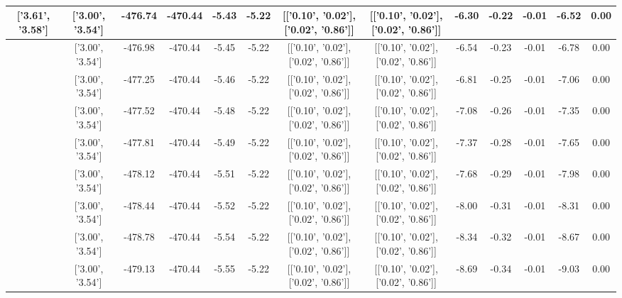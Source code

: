 \begin{table}[htbp]
\begin{adjustbox}{angle=90}
\begin{tabular}{|c|c|c|c|c|c|c|c|c|c|c|c|c|}
 ['3.61', '3.58'] & ['3.00', '3.54'] & -476.74 & -470.44 & -5.43 & -5.22 & [['0.10', '0.02'], ['0.02', '0.86']] & [['0.10', '0.02'], ['0.02', '0.86']] & -6.30 & -0.22 & -0.01 & -6.52 & 0.00\\ \hline
 ['3.64', '3.58'] & ['3.00', '3.54'] & -476.98 & -470.44 & -5.45 & -5.22 & [['0.10', '0.02'], ['0.02', '0.86']] & [['0.10', '0.02'], ['0.02', '0.86']] & -6.54 & -0.23 & -0.01 & -6.78 & 0.00\\ \hline
 ['3.68', '3.59'] & ['3.00', '3.54'] & -477.25 & -470.44 & -5.46 & -5.22 & [['0.10', '0.02'], ['0.02', '0.86']] & [['0.10', '0.02'], ['0.02', '0.86']] & -6.81 & -0.25 & -0.01 & -7.06 & 0.00\\ \hline
 ['3.72', '3.59'] & ['3.00', '3.54'] & -477.52 & -470.44 & -5.48 & -5.22 & [['0.10', '0.02'], ['0.02', '0.86']] & [['0.10', '0.02'], ['0.02', '0.86']] & -7.08 & -0.26 & -0.01 & -7.35 & 0.00\\ \hline
 ['3.76', '3.59'] & ['3.00', '3.54'] & -477.81 & -470.44 & -5.49 & -5.22 & [['0.10', '0.02'], ['0.02', '0.86']] & [['0.10', '0.02'], ['0.02', '0.86']] & -7.37 & -0.28 & -0.01 & -7.65 & 0.00\\ \hline
 ['3.80', '3.59'] & ['3.00', '3.54'] & -478.12 & -470.44 & -5.51 & -5.22 & [['0.10', '0.02'], ['0.02', '0.86']] & [['0.10', '0.02'], ['0.02', '0.86']] & -7.68 & -0.29 & -0.01 & -7.98 & 0.00\\ \hline
 ['3.83', '3.60'] & ['3.00', '3.54'] & -478.44 & -470.44 & -5.52 & -5.22 & [['0.10', '0.02'], ['0.02', '0.86']] & [['0.10', '0.02'], ['0.02', '0.86']] & -8.00 & -0.31 & -0.01 & -8.31 & 0.00\\ \hline
 ['3.87', '3.60'] & ['3.00', '3.54'] & -478.78 & -470.44 & -5.54 & -5.22 & [['0.10', '0.02'], ['0.02', '0.86']] & [['0.10', '0.02'], ['0.02', '0.86']] & -8.34 & -0.32 & -0.01 & -8.67 & 0.00\\ \hline
 ['3.91', '3.60'] & ['3.00', '3.54'] & -479.13 & -470.44 & -5.55 & -5.22 & [['0.10', '0.02'], ['0.02', '0.86']] & [['0.10', '0.02'], ['0.02', '0.86']] & -8.69 & -0.34 & -0.01 & -9.03 & 0.00\\ \hline
            \end{tabular}
        \end{adjustbox}
        \caption{}
        \label{}
    \end{table}
    